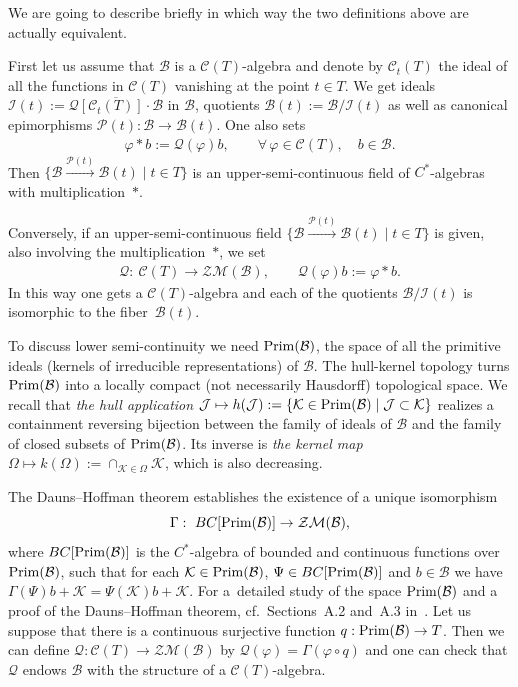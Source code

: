 \documentclass[11pt]{article}
\def\C{\mathcal{C}}
\def\B{{\mathcal B}}
\def\K{\mathcal K}
\def\Q{\mathcal Q}
\def\P{\mathcal P}
\begin{document}
We are going to describe brief\/ly in which way the two def\/initions above are actually equivalent.

First let us assume that $\B$ is a $\C(T)$-algebra and denote by $\C_t(T)$ the ideal of all the functions in
$\C(T)$ vanishing at the point $t\in T$. We get ideals
$\mathcal I(t):=\overline{\Q\left[\C_t(T)\right]\cdot\B}$ in $\B$, quotients $\B(t):=\B/\mathcal I(t)$ as well as canonical
epimorphisms $\P(t):\B\rightarrow \B(t)$. One also sets
\begin{gather*}%
\varphi\ast b:=\Q(\varphi)b ,\qquad \forall\,\varphi\in\C(T),\quad b\in\B .
\end{gather*}
Then $\big\{\mathcal B\overset{\P(t)}{\longrightarrow}\mathcal B(t)\mid t\in T\big\}$ is an upper-semi-continuous
f\/ield of $C^*$-algebras with multiplication~$\ast$.

Conversely, if an upper-semi-continuous f\/ield
$\big\{\mathcal B\overset{\P(t)}{\longrightarrow}\mathcal B(t)\mid t\in T\big\}$ is given,
also involving the multiplication~$\ast$, we set
\begin{gather*}%
\Q: \ \C(T)\rightarrow\mathcal Z\mathcal M(\B),\qquad \Q(\varphi)b:=\varphi\ast b.
\end{gather*}
In this way one gets a $\C(T)$-algebra and each of the quotients $\B/\mathcal I(t)$ is isomorphic to the f\/i\-ber~$\B(t)$.

To discuss lower semi-continuity we need ${\rm Prim}(\B)$, the space of all the primitive ideals
(kernels of irreducible representations) of $\B$. The hull-kernel topology
turns ${\rm Prim}(\B)$ into a locally compact (not necessarily Hausdorf\/f) topological space. We recall that {\it the hull application}
$\mathcal J\mapsto h(\mathcal J):=\{\mathcal K\in {\rm Prim}(\B)\mid \mathcal J\subset\mathcal K\}$
realizes a containment reversing bijection between the family of ideals of $\B$ and the family
of closed subsets of ${\rm Prim}(\B)$. Its inverse is {\it the kernel map}
$\Omega\mapsto k(\Omega):=\cap_{\mathcal K\in\Omega}\mathcal K$, which is also decreasing.

The Dauns--Hof\/fman theorem establishes the existence of a unique isomorphism
\[
\Gamma: \ BC[{\rm Prim}(\B)]\to \mathcal Z\mathcal M(\B) ,
\] where $BC[{\rm Prim}(\B)]$ is the $C^*$-algebra of bounded and continuous
functions over ${\rm Prim}(\B)$, such that for each $\K\in {\rm Prim}(\B)$,
$\Psi\in BC[{\rm Prim}(\B)]$ and $b\in\B$ we have $\Gamma(\Psi)b+\mathcal K=\Psi(\mathcal K)b+\mathcal K$.
For a~detailed study of the space ${\rm Prim}(\B)$ and a
proof of the Dauns--Hof\/fman theorem, cf.\ Sections~A.2 and~A.3 in~\cite{RW}.
Let us suppose that there is a continuous surjective function $q:{\rm Prim}(\B)\to T$. Then we can def\/ine
$\Q:\C(T)\to \mathcal Z\mathcal M(\B)$ by $\Q(\varphi)=\Gamma(\varphi\circ q)$ and one can check that
$\Q$ endows $\B$ with the structure of a $\C(T)$-algebra.
\end{document}
